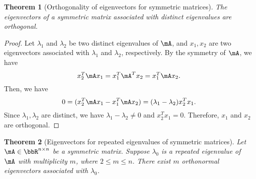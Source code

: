 \documentclass[11pt]{article}
\theoremstyle{plain}
\newtheorem{thm}{Theorem}[section]
\theoremstyle{definition}
\begin{document}
\begin{thm}[Orthogonality of eigenvectors for symmetric matrices]\label{thm:symmortho}
The eigenvectors of a symmetric matrix associated with distinct eigenvalues are orthogonal.
\end{thm}


\begin{proof}
	Let $\lambda_1$ and $\lambda_2$ be two distinct eigenvalues of $\mA$, and  $x_1, x_2$ are two eigenvectors associated with $\lambda_1$ and $\lambda_2$, respectively. By the symmetry of $\mA$, we have
	\[ x_2^T \mA x_1 = x_1^T \mA^T x_2  = x_1^T \mA x_2.\]
	Then, we have
	\[  0 = ( x_2^T \mA x_1 -  x_1^T \mA x_2 ) = (\lambda_1 - \lambda_2) x_2^T x_1. \]
	Since $\lambda_1, \lambda_2$ are distinct, we have $\lambda_1 - \lambda_2 \neq 0$ and $x_2^T x_1 = 0$. Therefore, $x_1$ and $x_2$ are orthogonal. 
\end{proof}

\begin{thm}[Eigenvectors for repeated eigenvalues of symmetric matrices]\label{thm:symmrepeat} Let  $\mA \in \bbR^{n \times n}$ be a symmetric matrix. Suppose $\lambda_0$ is a repeated eigenvalue of $\mA$ with multiplicity $m$, where $2 \leq m \leq n$. There exist $m$ orthonormal eigenvectors associated with $\lambda_0$.
\end{thm}
\end{document}
